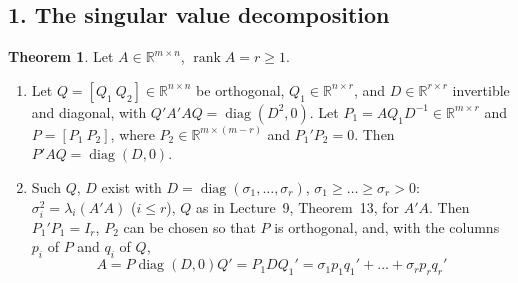 \documentclass[12pt]{article}
\newcommand{\R}{\mathbb R}
\DeclareMathOperator{\diag}{diag}
\DeclareMathOperator{\rank}{rank}
\theoremstyle{definition}
\newtheorem{theorem}{Theorem}
\newcommand{\lec}[1]{Lecture~#1}
\begin{document}
\subsection*{1. The singular value decomposition}

\begin{theorem}\label{b15.9}
Let \(A\in\R^{m\times n}\), \(\rank A=r\geqslant1\).
\begin{enumerate}
\item Let \(Q=[Q_1\ Q_2]\in\R^{n\times n}\) be orthogonal, \(Q_1\in\R^{n\times r}\), and \(D\in\R^{r\times r}\)
invertible and diagonal, with \(Q'A'AQ=\diag(D^2,0)\). Let \(P_1=AQ_1D^{-1}\in\R^{m\times r}\) and \(P=[P_1\ P_2]\),
where \(P_2\in\R^{m\times(m-r)}\) and \(P_1'P_2=0\). Then \(P'AQ=\diag(D,0)\).
\item Such \(Q\), \(D\) exist with \(D=\diag(\sigma_1,\dots,\sigma_r)\), \(\sigma_1\geqslant\dots\geqslant\sigma_r>0\):
\(\sigma_i^2=\lambda_i(A'A)\) (\(i\leqslant r\)), \(Q\) as in \lec{9}, Theorem~13, for \(A'A\). Then \(P_1'P_1=I_r\),
\(P_2\) can be chosen so that \(P\) is orthogonal, and, with the columns \(p_i\) of \(P\) and \(q_i\) of \(Q\),
\[
A=P\diag(D,0)Q'=P_1DQ_1'=\sigma_1p_1q_1'+\dots+\sigma_rp_rq_r'
\]
\end{enumerate}
\end{theorem}
\end{document}
